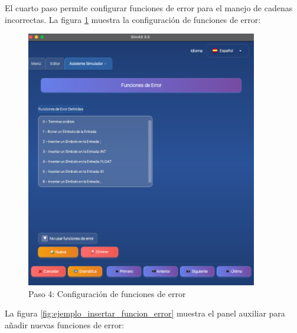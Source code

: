 El cuarto paso permite configurar funciones de error para el manejo de cadenas incorrectas. La figura \ref{fig:ejemplo_simulador_paso4} muestra la configuración de funciones de error:

\needspace{8cm}
\begin{figure}[H]
    \centering
    \includegraphics[width=0.9\textwidth]{figuras/ejemplo_practico/simulador_paso4.png}
    \caption{Paso 4: Configuración de funciones de error}
    \label{fig:ejemplo_simulador_paso4}
\end{figure}

La figura \ref{fig:ejemplo_insertar_funcion_error} muestra el panel auxiliar para añadir nuevas funciones de error:

